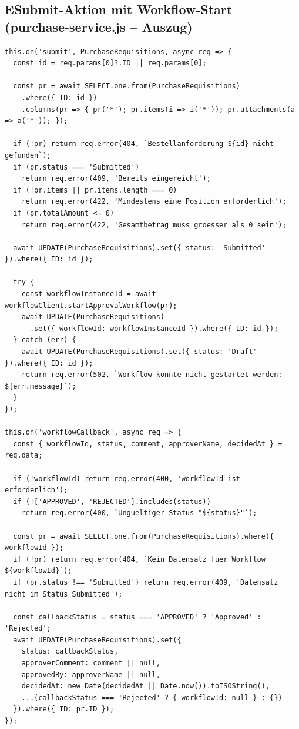 \subsection*{E\quad Submit-Aktion mit Workflow-Start (purchase-service.js -- Auszug)}
\begin{lstlisting}[caption={Submit-Aktion: Validierung, Statuswechsel und Workflow-Start},label={lst:anhang-submit}]
this.on('submit', PurchaseRequisitions, async req => {
  const id = req.params[0]?.ID || req.params[0];

  const pr = await SELECT.one.from(PurchaseRequisitions)
    .where({ ID: id })
    .columns(pr => { pr('*'); pr.items(i => i('*')); pr.attachments(a => a('*')); });

  if (!pr) return req.error(404, `Bestellanforderung ${id} nicht gefunden`);
  if (pr.status === 'Submitted')
    return req.error(409, 'Bereits eingereicht');
  if (!pr.items || pr.items.length === 0)
    return req.error(422, 'Mindestens eine Position erforderlich');
  if (pr.totalAmount <= 0)
    return req.error(422, 'Gesamtbetrag muss groesser als 0 sein');

  await UPDATE(PurchaseRequisitions).set({ status: 'Submitted' }).where({ ID: id });

  try {
    const workflowInstanceId = await workflowClient.startApprovalWorkflow(pr);
    await UPDATE(PurchaseRequisitions)
      .set({ workflowId: workflowInstanceId }).where({ ID: id });
  } catch (err) {
    await UPDATE(PurchaseRequisitions).set({ status: 'Draft' }).where({ ID: id });
    return req.error(502, `Workflow konnte nicht gestartet werden: ${err.message}`);
  }
});

this.on('workflowCallback', async req => {
  const { workflowId, status, comment, approverName, decidedAt } = req.data;

  if (!workflowId) return req.error(400, 'workflowId ist erforderlich');
  if (!['APPROVED', 'REJECTED'].includes(status))
    return req.error(400, `Ungueltiger Status "${status}"`);

  const pr = await SELECT.one.from(PurchaseRequisitions).where({ workflowId });
  if (!pr) return req.error(404, `Kein Datensatz fuer Workflow ${workflowId}`);
  if (pr.status !== 'Submitted') return req.error(409, 'Datensatz nicht im Status Submitted');

  const callbackStatus = status === 'APPROVED' ? 'Approved' : 'Rejected';
  await UPDATE(PurchaseRequisitions).set({
    status: callbackStatus,
    approverComment: comment || null,
    approvedBy: approverName || null,
    decidedAt: new Date(decidedAt || Date.now()).toISOString(),
    ...(callbackStatus === 'Rejected' ? { workflowId: null } : {})
  }).where({ ID: pr.ID });
});
\end{lstlisting}

